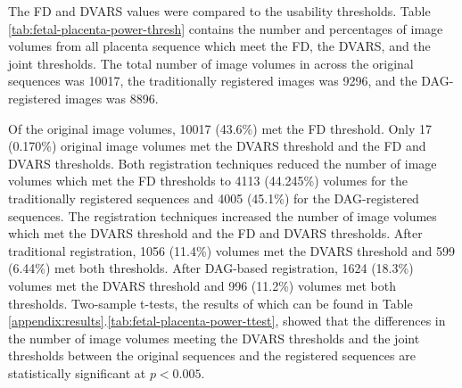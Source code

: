The FD and DVARS values were compared to the usability thresholds. Table \ref{tab:fetal-placenta-power-thresh} contains the number and percentages of image volumes from all placenta sequence which meet the FD, the DVARS, and the joint thresholds. The total number of image volumes in across the original sequences was 10017, the traditionally registered images was 9296, and the DAG-registered images was 8896. 

Of the original image volumes, 10017 (43.6\%) met the FD threshold. Only 17 (0.170\%) original image volumes met the DVARS threshold and the FD and DVARS thresholds. Both registration techniques reduced the number of image volumes which met the FD thresholds to 4113 (44.245\%) volumes for the traditionally registered sequences and 4005 (45.1\%) for the DAG-registered sequences. The registration techniques increased the number of image volumes which met the DVARS threshold and the FD and DVARS thresholds. After traditional registration, 1056 (11.4\%) volumes met the DVARS threshold and 599 (6.44\%) met both thresholds. After DAG-based registration, 1624 (18.3\%) volumes met the DVARS threshold and 996 (11.2\%) volumes met both thresholds. Two-sample t-tests, the results of which can be found in Table \ref{appendix:results}.\ref{tab:fetal-placenta-power-ttest}, showed that the differences in the number of image volumes meeting the DVARS thresholds and the joint thresholds between the original sequences and the registered sequences are statistically significant at $p < 0.005$.

